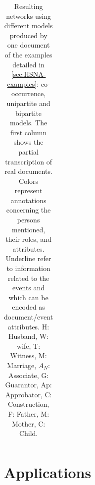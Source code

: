 \begin{table}
\begin{tabular}{|m{4.4cm}|m{2.4cm}|m{2.4cm}|m{2.4cm}|}
        \hline
    \end{tabular}
    \caption{Resulting networks using different models produced by one document of the examples detailed in \autoref{sec:HSNA-examples}: co-occurrence, unipartite and bipartite models. The first column shows the partial transcription of real documents. Colors represent annotations concerning the persons mentioned, their roles, and attributes. Underline refer to information related to the events and which can be encoded as document/event attributes.
    H: Husband, W: wife, T: Witness, M: Marriage, $A_N$: Associate, G: Guarantor, Ap: Approbator, C: Construction, F: Father, M: Mother, C: Child.
    }\label{tab:models}
\end{table}


\section{Applications}



